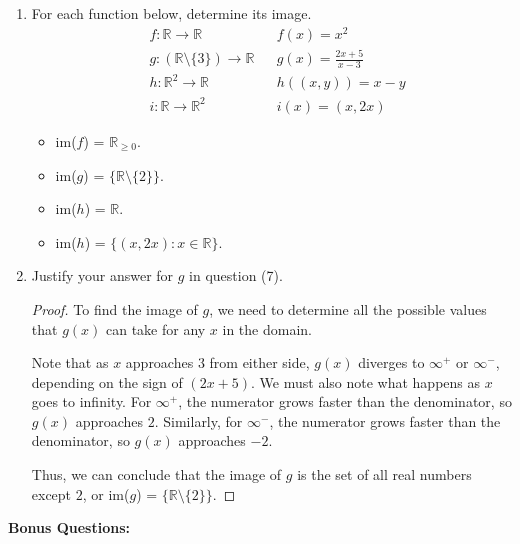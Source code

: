 \documentclass{article}
\begin{document}
\begin{enumerate}
	\item For each function below, determine its image.
		\begin{align*}
			& f : \mathbb{R} \rightarrow \mathbb{R} & & f(x) = x^2 \\
			& g : (\mathbb{R} \setminus \{ 3 \}) \rightarrow \mathbb{R} & & g(x) = \frac{2x + 5}{x - 3} \\
			& h : \mathbb{R}^2 \rightarrow \mathbb{R} & & h((x,y)) = x - y \\
			& i : \mathbb{R} \rightarrow \mathbb{R}^2 & & i(x) = (x, 2x) 
		\end{align*}
             \begin{itemize}
                \item im($f$) = $\mathbb{R}_{\ge 0}$.
                \item im($g$) = $\{ \mathbb{R} \setminus \{ 2 \} \}$.
                \item im($h$) = $\mathbb{R}$.
                \item im($h$) = $\{ (x, 2x) : x \in\mathbb{R} \}$.
            \end{itemize}

	\item Justify your answer for $g$ in question (7).
            \begin{proof}
                To find the image of $g$, we need to determine all the possible values that $g(x)$ can take for any $x$ in the domain.
                \par
                Note that as $x$ approaches $3$ from either side, $g(x)$ diverges to $\infty^+$ or $\infty^\minus$, depending on the sign of $(2x + 5)$. We must also note what happens as $x$ goes to infinity. For $\infty^+$, the numerator grows faster than the denominator, so $g(x)$ approaches $2$. Similarly, for $\infty^\minus$, the numerator grows faster than the denominator, so $g(x)$ approaches $\minus2$.
                \par
                Thus, we can conclude that the image of $g$ is the set of all real numbers except $2$, or im($g$) = $\{ \mathbb{R} \setminus \{ 2 \} \}$.
            \end{proof}
 
    \end{enumerate}

    \newpage
    \textbf{Bonus Questions:}
    
\end{document}
